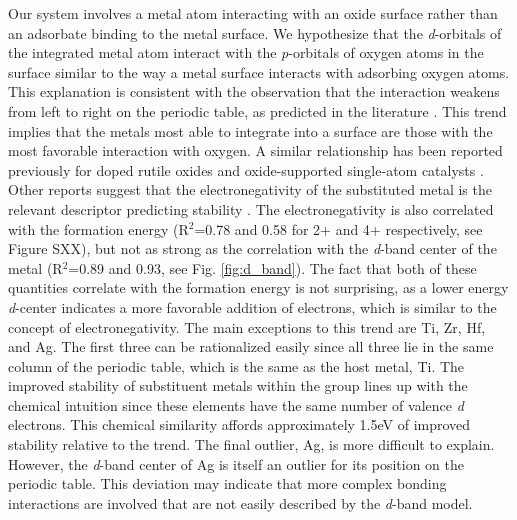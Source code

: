 Our system involves a metal atom interacting with an oxide surface rather than an adsorbate binding to the metal surface. We hypothesize that the \textit{d}-orbitals of the integrated metal atom interact with the \textit{p}-orbitals of oxygen atoms in the surface similar to the way a metal surface interacts with adsorbing oxygen atoms. This explanation is consistent with the observation that the interaction weakens from left to right on the periodic table, as predicted in the literature \cite{Hammer_2000}. This trend implies that the metals most able to integrate into a surface are those with the most favorable interaction with oxygen. A similar relationship has been reported previously for doped rutile oxides \cite{Xu_2015} and oxide-supported single-atom catalysts \cite{O_Connor_2018}. Other reports suggest that the electronegativity of the substituted metal is the relevant descriptor predicting stability \cite{Garc_a_Mota_2011}. The electronegativity is also correlated with the formation energy (R$^2$=0.78 and 0.58 for 2+ and 4+ respectively, see Figure SXX), but not as strong as the correlation with the \textit{d}-band center of the metal (R$^2$=0.89 and 0.93, see Fig. \ref{fig:d_band}). The fact that both of these quantities correlate with the formation energy is not surprising, as a lower energy \textit{d}-center indicates a more favorable addition of electrons, which is similar to the concept of electronegativity. %
The main exceptions to this trend are Ti, Zr, Hf, and Ag. The first three can be rationalized easily since all three lie in the same column of the periodic table, which is the same as the host metal, Ti. The improved stability of substituent metals within the group lines up with the chemical intuition since these elements have the same number of valence \textit{d} electrons. This chemical similarity affords approximately 1.5eV of improved stability relative to the trend. The final outlier, Ag, is more difficult to explain. However, the \textit{d}-band center of Ag is itself an outlier for its position on the periodic table. This deviation may indicate that more complex bonding interactions are involved that are not easily described by the \textit{d}-band model.

